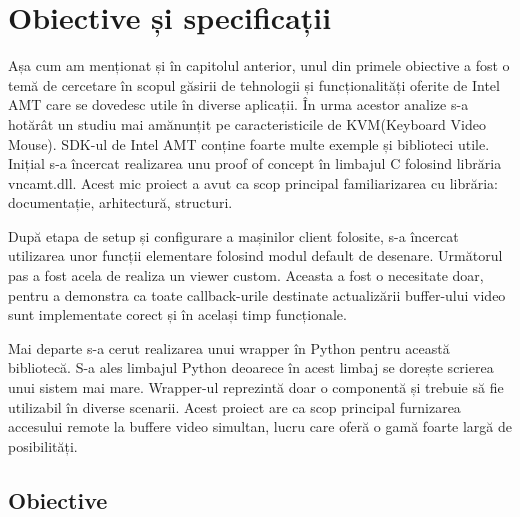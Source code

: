 
\chapter{Obiective și specificații}
\label{cap:obiective-specificatii}

%

Așa cum am menționat și în capitolul anterior, unul din primele obiective a fost o temă de cercetare în scopul găsirii de tehnologii și funcționalități oferite de Intel AMT care se dovedesc utile în diverse aplicații. În urma acestor analize s-a hotărât un studiu mai amănunțit pe caracteristicile de KVM(Keyboard Video Mouse). SDK-ul de Intel AMT conține foarte multe exemple și biblioteci utile. Inițial s-a încercat realizarea unu proof of concept în limbajul C folosind librăria vncamt.dll. Acest mic proiect a avut ca scop principal familiarizarea cu librăria: documentație, arhitectură, structuri.

După etapa de setup și configurare a mașinilor client folosite, s-a încercat utilizarea unor funcții elementare folosind modul default de desenare. Următorul pas a fost acela de realiza un viewer custom. Aceasta a fost o necesitate doar, pentru a demonstra ca toate callback-urile destinate actualizării buffer-ului video sunt implementate corect și în același timp funcționale.

Mai departe s-a cerut realizarea unui wrapper în Python pentru această bibliotecă. S-a ales limbajul Python deoarece în acest limbaj se dorește scrierea unui sistem mai mare. Wrapper-ul reprezintă doar o componentă și trebuie să fie utilizabil în diverse scenarii. Acest proiect are ca scop principal furnizarea accesului remote la buffere video simultan, lucru care oferă o gamă foarte largă de posibilități.

\section{Obiective}


